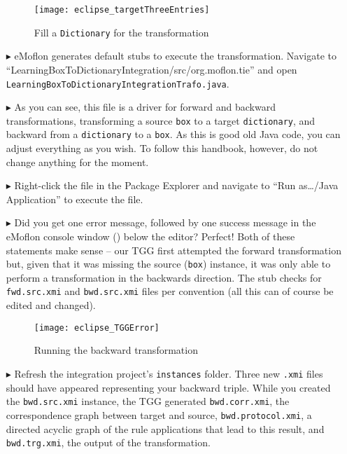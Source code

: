 \begin{itemize}
\begin{figure}[htbp]
\begin{center}
  \texttt{[image: eclipse\_targetThreeEntries]}
  \caption{Fill a \texttt{Dictionary} for the transformation}
  \label{eclipse:dictionaryxmi}
\end{center}
\end{figure}

\item[$\blacktriangleright$] eMoflon generates default stubs to execute the transformation.
Navigate to ``LearningBox\-To\-Dictionary\-In\-te\-gra\-tion\-/\-src/\-org.\-mof\-lon.\-tie'' and open \texttt{Learn\-ing\-Box\-To\-Dict\-ion\-ary\-Int\-e\-grat\-ion\-Trafo.\-java}.

\item[$\blacktriangleright$] As you can see, this file is a driver for forward and backward transformations, transforming a source \texttt{box} to a target \texttt{dictionary}, and backward from a \texttt{dictionary} to a \texttt{box}. 
As this is good old Java code, you can adjust everything as you wish.
To follow this handbook, however, do not change anything for the moment.

\item[$\blacktriangleright$] Right-click the file in the Package Explorer and navigate to ``Run as\ldots/Java Application'' to execute the file.

\item[$\blacktriangleright$] Did you get one error message, followed by one success message in the eMoflon console window () below
the editor? Perfect! Both of these statements make sense -- our TGG first attempted the forward transformation but, given that it was missing the source
(\texttt{box}) instance, it was only able to perform a transformation in the backwards direction.
The stub checks for \texttt{fwd.src.xmi} and \texttt{bwd.src.xmi} files per convention (all this can of course be edited and changed).

\begin{figure}[htbp]
\begin{center}
  \texttt{[image: eclipse\_TGGError]}
  \caption{Running the backward transformation}
  \label{eclipse:tggERROR}
\end{center}
\end{figure}

\item[$\blacktriangleright$] Refresh the integration project's \texttt{instances} folder. 
Three new \texttt{.xmi} files should have appeared representing your backward triple. 
While you created the \texttt{bwd.src.xmi} instance, the TGG generated \texttt{bwd.corr.xmi}, the correspondence graph between target and source, \texttt{bwd.protocol.xmi}, a directed acyclic graph of the rule applications that lead to this result, and \texttt{bwd.trg.xmi}, the output of the transformation. 


\end{itemize}
